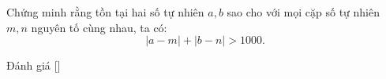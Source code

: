 \ifshowproblem
\begin{problem}\label{problem:RUS-2015-TST-D11-P1}
    Chứng minh rằng tồn tại hai số tự nhiên \( a, b \) sao cho với mọi cặp số tự nhiên \( m, n \) nguyên tố cùng nhau, ta có:
    \[
        |a - m| + |b - n| > 1000.
    \]
\end{problem}
\fi

\ifshowinfo
Đánh giá [\textbf{}]\footnotemark
{}
\fi